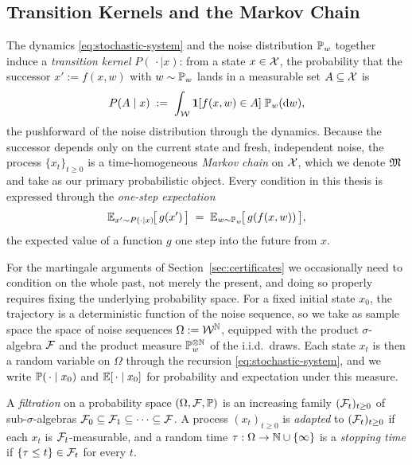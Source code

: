 \subsection{Transition Kernels and the Markov Chain}
\label{subsec:kernels}

The dynamics \eqref{eq:stochastic-system} and the noise distribution $\mathbb{P}_w$
together induce a \emph{transition kernel} $P(\,\cdot \mid x)$: from a state
$x \in \mathcal{X}$, the probability that the successor $x' := f(x, w)$ with
$w \sim \mathbb{P}_w$ lands in a measurable set $A \subseteq \mathcal{X}$ is
%
\begin{equation}
    P(A \mid x) \;:=\; \int_{\mathcal{W}} \mathbf{1}[f(x, w) \in A] \; \mathbb{P}_w(\mathrm{d}w),
    \label{eq:kernel}
\end{equation}
%
the pushforward of the noise distribution through the dynamics. Because the successor depends only on the current state and fresh,
independent noise, the process $\{x_t\}_{t \geq 0}$ is a time-homogeneous
\emph{Markov chain} on $\mathcal{X}$, which we denote $\mathfrak{M}$ and take as our primary
probabilistic object. Every condition in this thesis is expressed through the
\emph{one-step expectation}
%
\begin{equation}
    \mathbb{E}_{x' \sim P(\cdot \mid x)}\!\big[\,g(x')\,\big]
    \;=\; \mathbb{E}_{w \sim \mathbb{P}_w}\!\big[\,g(f(x, w))\,\big] ,
    \label{eq:onestep}
\end{equation}
%
the expected value of a function $g$ one step into the future from $x$.

For the martingale arguments of Section~\ref{sec:certificates} we occasionally
need to condition on the whole past, not merely the present, and doing so
properly requires fixing the underlying probability space. For a fixed initial
state $x_0$, the trajectory is a deterministic function of the noise sequence,
so we take as sample space the space of noise sequences
$\Omega := \mathcal{W}^{\mathbb{N}}$, equipped with the product $\sigma$-algebra $\mathcal{F}$ and the
product measure $\mathbb{P}_w^{\otimes\mathbb{N}}$ of the i.i.d.\ draws. Each state $x_t$
is then a random variable on $\Omega$ through the recursion
\eqref{eq:stochastic-system}, and we write $\mathbb{P}(\,\cdot \mid x_0)$ and
$\mathbb{E}[\,\cdot \mid x_0]$ for probability and expectation under this measure.

\begin{definition}
\label{def:filtration}
A \emph{filtration} on a probability space $(\Omega, \mathcal{F}, \mathbb{P})$ is an
increasing family $(\mathcal{F}_t)_{t \geq 0}$ of sub-$\sigma$-algebras
$\mathcal{F}_0 \subseteq \mathcal{F}_1 \subseteq \cdots \subseteq \mathcal{F}$. A process
$(x_t)_{t \geq 0}$ is \emph{adapted} to $(\mathcal{F}_t)_{t \geq 0}$ if each $x_t$ is
$\mathcal{F}_t$-measurable, and a random time
$\tau : \Omega \to \mathbb{N} \cup \{\infty\}$ is a \emph{stopping time} if
$\{\tau \leq t\} \in \mathcal{F}_t$ for every $t$.
\end{definition}

